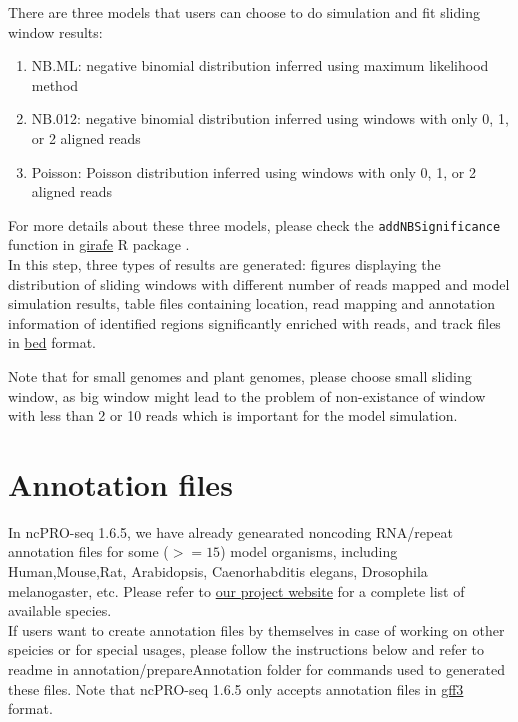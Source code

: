 \documentclass[12pt]{article}
\def \ncpip{ncPRO-seq 1.6.5}
\begin{document}
There are three models that users can choose to do simulation and fit sliding window results: 
\begin{enumerate}
 \item NB.ML: negative binomial distribution inferred using maximum likelihood method
 \item NB.012: negative binomial distribution inferred using windows with only 0, 1, or 2 aligned reads
 \item Poisson: Poisson distribution inferred using windows with only 0, 1, or 2 aligned reads
\end{enumerate}

For more details about these three models, please check the \verb+addNBSignificance+ function in \href{http://www.bioconductor.org/packages/2.6/bioc/html/girafe.html}{ girafe} R package \cite{Joern2010}.\\

In this step, three types of results are generated: figures displaying the distribution of sliding windows with different number of reads mapped and model simulation results, table files containing location, read mapping and annotation information of identified regions significantly enriched with reads, and track files in \href{http://genome.ucsc.edu/FAQ/FAQformat.html#format1}{bed} format.

Note that for small genomes and plant genomes, please choose small sliding window, as big window might lead to the problem of non-existance of window with less than 2 or 10 reads which is important for the model simulation.

\section{Annotation files}

In \ncpip{}, we have already genearated noncoding RNA/repeat annotation files for some ($>=15$) model organisms, including Human,Mouse,Rat, Arabidopsis, Caenorhabditis elegans, Drosophila melanogaster, etc. Please refer to \href{http://ncproseq.sourceforge.net/download.html}{ our project website} for a complete list of available species. \\If users want to create annotation files by themselves in case of working on other speicies or for special usages, please follow the instructions below and refer to readme in annotation/prepareAnnotation folder for commands used to generated these files. Note that \ncpip{} only accepts annotation files in \href{http://gmod.org/wiki/GFF#GFF3}{ gff3} format. 
\end{document}
